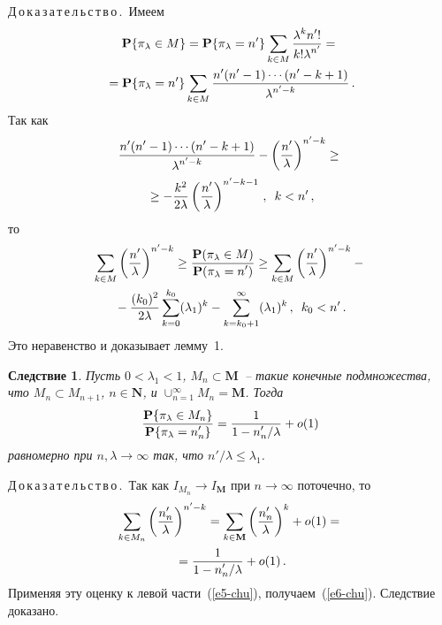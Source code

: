 \begin{multicols}{2}
\medskip


\noindent
Д\,о\,к\,а\,з\,а\,т\,е\,л\,ь\,с\,т\,в\,о\,.\ Имеем
\begin{multline*}
\mathbf{P}\{\pi_{\lambda}\in M\}={\mathbf{P}\{\pi_{\lambda}=n'\}}\sum\limits_{k\in
M}\displaystyle\frac{\displaystyle \lambda^kn'!\mathstrut}{\displaystyle k!\lambda^{n'}\mathstrut}={}\\
{}=\mathbf{P}\{\pi_{\lambda}=n'\}\sum\limits_{k\in
M}\displaystyle\frac{\displaystyle n'(n'-1)\cdots(n'-k+1)\mathstrut}{\displaystyle \lambda^{n'-k}\mathstrut}\,.
\end{multline*}
Так как
\begin{multline*}
\displaystyle\frac{\displaystyle n'(n'-1)\cdots
(n'-k+1)\mathstrut}{\displaystyle \lambda^{n'-k}\mathstrut}-\left(\displaystyle\frac{\displaystyle n'\mathstrut}{\displaystyle \lambda\mathstrut}\right)^{n'-k}\ge{}\\
{}\ge
-\frac{k^2}{2\lambda}\left(\displaystyle\frac{\displaystyle n'\mathstrut}{\displaystyle \lambda\mathstrut}\right)^{n'-k-1}\,,\enskip k<n'\,,
\end{multline*}
то
\begin{multline*}
\sum\limits_{k\in M}\left(\displaystyle\frac{\displaystyle n'\mathstrut}{\displaystyle \lambda\mathstrut}\right)^{n'-k}\ge\displaystyle\frac{\displaystyle \mathbf{P}
(\pi_{\lambda}\in M)\mathstrut}{\displaystyle \mathbf{P}(\pi_{\lambda}=n')\mathstrut}\ge\sum\limits_{k\in
M}\left(\displaystyle\frac{\displaystyle n'\mathstrut}{\displaystyle \lambda\mathstrut}\right)^{n'-k}-{}\\
{}-\displaystyle\frac{\displaystyle (k_0)^2\mathstrut}{\displaystyle 2\lambda\mathstrut}\sum\limits_{k=0}^{k_0}(\lambda_1)^k
-\sum\limits_{k=k_0+1}^{\infty}(\lambda_1)^k\,,\enskip k_0<n'\,.
\end{multline*}
Это неравенство и доказывает  лемму~1.

\medskip


\noindent
\textbf{Следствие 1}. \textit{Пусть $0<\lambda_1<1$,  $M_n\subset \mathbf{M}$~-- 
такие конечные подмножества, что $M_n\subset M_{n+1}$, $n\in \mathbf{N}$, 
и $\cup_{n=1}^{\infty}M_n =\mathbf{M}$.  Тогда
\begin{equation}
\displaystyle\frac{\displaystyle \mathbf{P}\{\pi_{\lambda}\in M_n\}\mathstrut}{\displaystyle \mathbf{P}\{\pi_{\lambda}=n'_n\}\mathstrut}=
\displaystyle\frac{\displaystyle 1\mathstrut}{\displaystyle 1-{n'_n}/{\lambda}\mathstrut}+o(1)
\label{e6-chu}
\end{equation}
 равномерно при $n, \lambda\to\infty$ так, что
 ${n'}/{\lambda}\le\lambda_1$.}

\medskip

\noindent
Д\,о\,к\,а\,з\,а\,т\,е\,л\,ь\,с\,т\,в\,о\,.\ Так как $I_{M_n}\to I_{\mathbf{M}}$ при
 $n\to\infty$ поточечно, то 
\begin{multline*}
 \sum\limits_{k\in M_n}\left(\displaystyle\frac{\displaystyle n'_n\mathstrut}{\displaystyle \lambda\mathstrut}\right)^{n'-k}=\sum\limits_{k\in \mathbf{M}}
 \left(\displaystyle\frac{\displaystyle n'_n\mathstrut}{\displaystyle \lambda\mathstrut}\right)^{k}+
o(1)={}\\
{}=\displaystyle\frac{\displaystyle 1\mathstrut}{\displaystyle 1-{n'_n}/{\lambda}\mathstrut}+o(1)\,.
\end{multline*} 
Применяя эту оценку к
левой части~(\ref{e5-chu}), получаем~(\ref{e6-chu}). Следствие доказано.


\end{multicols}
